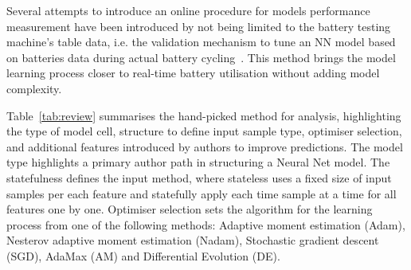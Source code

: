 %
%
Several attempts to introduce an online procedure for models performance measurement have been introduced by not being limited to the battery testing machine's table data, i.e. the validation mechanism to tune an NN model based on batteries data during actual battery cycling~\cite{zhang_deep_2020}.
This method brings the model learning process closer to real-time battery utilisation without adding model complexity. 

%
%
Table~\ref{tab:review} summarises the hand-picked method for analysis, highlighting the type of model cell, structure to define input sample type, optimiser selection, and additional features introduced by authors to improve predictions.
The model type highlights a primary author path in structuring a Neural Net model.
The statefulness defines the input method, where stateless uses a fixed size of input samples per each feature and statefully apply each time sample at a time for all features one by one.
Optimiser selection sets the algorithm for the learning process from one of the following methods: Adaptive moment estimation (Adam), Nesterov adaptive moment estimation  (Nadam), Stochastic gradient descent (SGD), AdaMax (AM) and Differential Evolution (DE).

